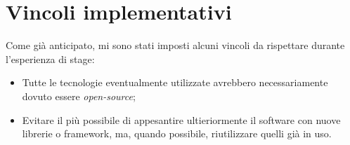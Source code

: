 \section{Vincoli implementativi} 
Come già anticipato, mi sono stati imposti alcuni vincoli da rispettare durante l'esperienza di stage:
\begin{itemize}
	\item Tutte le tecnologie eventualmente utilizzate avrebbero necessariamente dovuto essere \emph{open-source};
	\item Evitare il più possibile di appesantire ultieriormente il software con nuove librerie o \gls{framework}, ma, quando possibile, riutilizzare quelli già in uso.
\end{itemize}

\newpage